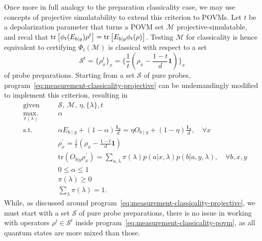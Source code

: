         Once more in full analogy to the preparation classicality case, we may use concepts of projective simulatability to extend this criterion to POVMs. Let $t$ be a depolarization parameter that turns a POVM set $\mathcal{M}$ projective-simulatable, and recal that $\text{tr}\left[  \phi_t( E_{b \mid y}) \rho^t  \right] = \text{tr}\left[  E_{b \mid y} \phi_t(\rho)  \right]$. Testing $\mathcal{M}$ for classicality is hence equivalent to certifying $\Phi_t \left( \mathcal{M} \right)$ is classical with respect to a set
        $$
            \mathcal{S}^t = \{ \rho_x^t \}_x = \Bigg\{ \frac{1}{t} \left( \rho_x - \frac{1-t}{d} \mathbf{1} \right) \Bigg\}_x
        $$
        of probe preparations. Starting from a set $\mathcal{S}$ of pure probes, program~\eqref{eq:measurement-classicality-projective} can be undemandingly modified to implement this criterion, resulting in
        \begin{subequations}
            \begin{alignat}{2}
                &\text{given}    &\quad & \mathcal{S},\, \mathcal{M},\, \eta, \{ \lambda \}, t \\
                &\underset{\pi(\lambda)}{\text{max.}}   &	  & \alpha \\
                &\text{s.t.}    &      & \alpha E_{b \mid y} + (1 - \alpha)\frac{\mathbf{1}_d}{d} = \eta O_{b \mid y} + \left( 1 - \eta \right) \frac{\mathbf{1}_d}{d}, \quad\forall x \\
                &                  &      & \rho_x^\prime = \frac{1}{t} \left( \rho_x - \frac{1-t}{d} \mathbf{1} \right) \\
                &                  &      & \text{tr}(O_{b \vert y} \rho_x^\prime) = \sum_{a, \lambda} \pi(\lambda) p(a \vert x, \lambda) p(b \vert a, y, \lambda), \quad\forall b, x, y \\
                &				   &	  & 0 \leq \alpha \leq 1 \\
                &				   &	  & \pi(\lambda) \geq 0 \\
                &				   &	  & \sum_\lambda \pi(\lambda) = 1 .
            \end{alignat}
            \label{eq:measurement-classicality-povm}
        \end{subequations}
        While, as discussed around program~\eqref{eq:measurement-classicality-projective}, we must start with a set $\mathcal{S}$ of pure probe preparations, there is no issue in working with operators $\rho^t \in \mathcal{S}^t$ inside program~\eqref{eq:measurement-classicality-povm}, as all quantum states are more mixed than those.

